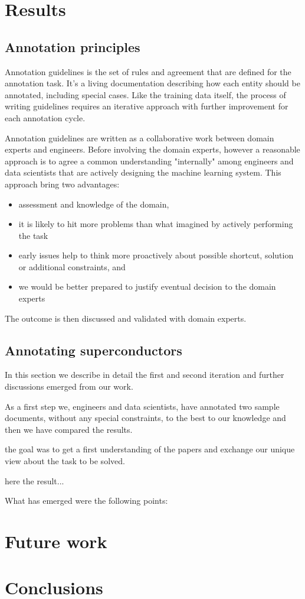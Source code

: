 \documentclass{article}
\begin{document}
\section{Results}

\subsection{Annotation principles}

Annotation guidelines is the set of rules and agreement that are defined for the annotation task. It's a living documentation describing how each entity should be annotated, including special cases. 
Like the training data itself, the process of writing guidelines requires an iterative approach with further improvement for each annotation cycle. 

Annotation guidelines are written as a collaborative work between domain experts and engineers. Before involving the domain experts, however a reasonable approach is to agree a common understanding "internally" among engineers and data scientists that are actively designing the machine learning system. 
This approach bring two advantages: 
\begin{itemize}
    \item assessment and knowledge of the domain, 
    \item it is likely to hit more problems than what imagined by actively performing the task 
    \item early issues help to think more proactively about possible shortcut, solution or additional constraints, and 
    \item we would be better prepared to justify eventual decision to the domain experts
\end{itemize}

The outcome is then discussed and validated with domain experts. 

\subsection{Annotating superconductors}
In this section we describe in detail the first and second iteration and further discussions emerged from our work.

As a first step we, engineers and data scientists, have annotated two sample documents, without any special constraints, to the best to our knowledge and then we have compared the results. 

the goal was to get a first understanding of the papers and exchange our unique view about the task to be solved. 

here the result...


What has emerged were the following points: 

\section{Future work}
\section{Conclusions}

\listoffigures



\end{document}
